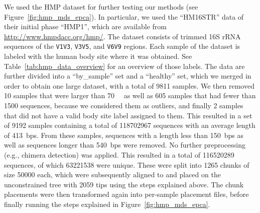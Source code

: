 We used the \acf{HMP} dataset \citep{Huttenhower2012,Methe2012} for further testing our methods
(see Figure~\ref{fig:hmp_mds_epca}).
In particular, we used the ``HM16STR'' data of their initial phase ``HMP1'',
which are available from \url{http://www.hmpdacc.org/hmp/}.
The dataset consists of trimmed 16S rRNA sequences of the \texttt{V1V3}, \texttt{V3V5}, and \texttt{V6V9} regions.
Each sample of the dataset is labeled with the human body site where it was obtained.
See Table~\ref{tab:hmp_data_overview} for an overview of those labels.
The data are further divided into a ``by\_sample'' set and a ``healthy'' set,
which we merged in order to obtain one large dataset, with a total of \num{9 811} samples.
We then removed \num{10} samples that were larger than \SI{70}{\mega\byte}
as well as \num{605} samples that had fewer than \num{1 500} sequences,
because we considered them as outliers,
and finally \num{2} samples that did not have a valid body site label assigned to them.
This resulted in a set of \num{9192} samples
containing a total of \num{118 702 967} sequences with an average length of \SI{413}{bps}.
From these samples, sequences with a length less than \SI{150}{bps}
as well as sequences longer than \SI{540}{bps} were removed.
No further preprocessing (e.g., chimera detection) was applied.
This resulted in a total of \num{116 520 289} sequences, of which \num{63 221 538} were unique.
These were split into \num{1 265} chunks of size \num{50 000} each, which were subsequently aligned to and
placed on the unconstrained  tree with \num{2 059} tips using the steps explained above.
The chunk placements were then transformed again into per-sample placement files,
before finally running the steps explained in Figure~\ref{fig:hmp_mds_epca}.


